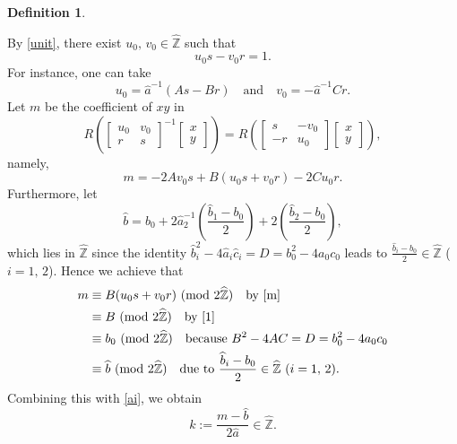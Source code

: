 \documentclass[reqno,11pt]{article}
\newcommand{\Mod}[1]{\ (\textup{mod}\ #1)}
\theoremstyle{plain} %
\theoremstyle{definition} %
\newtheorem{definition}[theorem]{\indent\sc Definition}
\begin{document}
\begin{definition}
\begin{enumerate}
By \eqref{unit}, there exist $u_0,\,v_0\in\widehat{\mathbb{Z}}$ such that
\begin{equation}\label{1}
u_0s-v_0r=1.
\end{equation}
For instance, one can take
\begin{equation*}
u_0=\widehat{a}^{-1}(As-Br)\quad
\textrm{and}\quad v_0=-\widehat{a}^{-1}Cr. 
\end{equation*}
Let $m$ be the coefficient of $xy$ in 
\begin{equation*}
R\left(\begin{bmatrix}u_0&v_0\\r&s\end{bmatrix}^{-1}\begin{bmatrix}x\\y\end{bmatrix}\right)
=R\left(\begin{bmatrix}s&-v_0\\-r&u_0\end{bmatrix}\begin{bmatrix}x\\y\end{bmatrix}\right),
\end{equation*}
namely,
\begin{equation}\label{m}
m=-2Av_0s+B(u_0s+v_0r)-2Cu_0r.
\end{equation}
Furthermore, let
\begin{equation}\label{bb2a2}
\widehat{b}=b_0+2\widehat{a}_2^{-1}\left(\frac{\widehat{b}_1-b_0}{2}\right)
+2\left(\frac{\widehat{b}_2-b_0}{2}\right),
\end{equation}
which lies in $\widehat{\mathbb{Z}}$
since the identity
$\widehat{b}_i^2-4\widehat{a}_i\widehat{c}_i=D=b_0^2-4a_0c_0$ 
leads to $\displaystyle\frac{\widehat{b}_i-b_0}{2}\in\widehat{\mathbb{Z}}$ ($i=1,\,2$).
Hence we achieve that
\begin{align*}
m&\equiv B(u_0s+v_0r)\Mod{2\widehat{\mathbb{Z}}}\quad
\textrm{by \eqref{m}}\\
&\equiv B\Mod{2\widehat{\mathbb{Z}}}\quad\textrm{by \eqref{1}}\\
&\equiv b_0\Mod{2\widehat{\mathbb{Z}}}\quad\textrm{because}~
B^2-4AC=D=b_0^2-4a_0c_0\\
&\equiv\widehat{b}\Mod{2\widehat{\mathbb{Z}}}\quad\textrm{due to}~
\frac{\widehat{b}_i-b_0}{2}\in\widehat{\mathbb{Z}}~(i=1,\,2). 
\end{align*}
Combining this with \eqref{ai}, we obtain
\begin{equation*}
k:=\frac{m-\widehat{b}}{2\widehat{a}}\in\widehat{\mathbb{Z}}.

\end{equation*}
\end{enumerate}
\end{definition}
\end{document}
